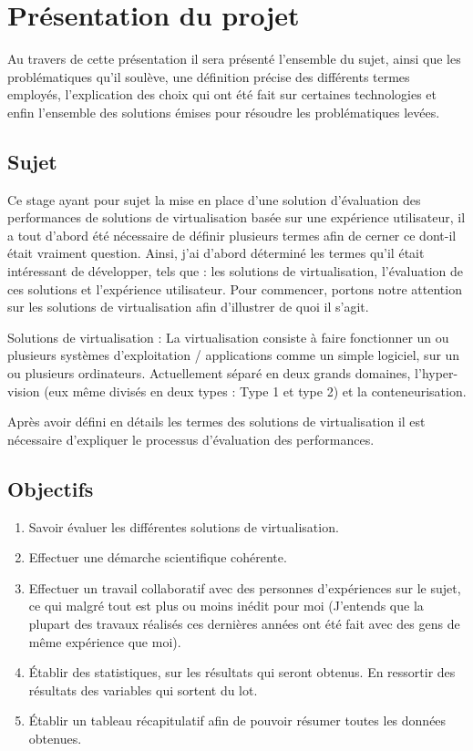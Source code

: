 \chapter{Présentation du projet}

Au travers de cette présentation il sera présenté l'ensemble du sujet, ainsi que les problématiques qu'il soulève, une définition précise des différents termes employés, l'explication des choix qui ont été fait sur certaines technologies et enfin l'ensemble des solutions émises pour résoudre les problématiques levées.
\section{Sujet}

Ce stage ayant pour sujet la mise en place d'une solution d'évaluation des performances de solutions de virtualisation basée sur une expérience utilisateur, il a tout d'abord été nécessaire de définir plusieurs termes afin de cerner ce dont-il était vraiment question. Ainsi, j'ai d'abord déterminé les termes qu'il était intéressant de développer, tels que : les solutions de virtualisation, l'évaluation de ces solutions et l'expérience utilisateur. Pour commencer, portons notre attention sur les solutions de virtualisation afin d'illustrer de quoi il s'agit. 


\begin{mydef}
Solutions de virtualisation : La virtualisation consiste à faire fonctionner un ou plusieurs systèmes d'exploitation / applications comme un simple logiciel, sur un ou plusieurs ordinateurs. Actuellement séparé en deux grands domaines, l’hyper-vision (eux même divisés en deux types : Type 1 et type 2) et la conteneurisation.
\end{mydef}

Après avoir défini en détails les termes des solutions de virtualisation il est nécessaire d'expliquer le processus d'évaluation des performances. 

\newpage
\section{Objectifs}
\begin{enumerate}
	\item Savoir évaluer les différentes solutions de virtualisation. 	
	\item Effectuer une démarche scientifique cohérente.
	\item Effectuer un travail collaboratif avec des personnes d’expériences sur le sujet, ce qui malgré tout est plus ou moins inédit pour moi (J’entends que la plupart des travaux réalisés ces dernières années ont été fait avec des gens de même expérience que moi).
	\item Établir des statistiques, sur les résultats qui seront obtenus. En ressortir des résultats des variables qui sortent du lot.
	\item Établir un tableau récapitulatif afin de pouvoir résumer toutes les données obtenues.
\end{enumerate}

